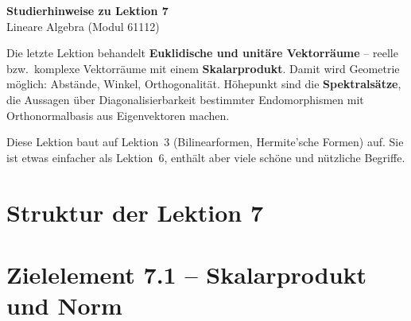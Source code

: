 \documentclass[a4paper,12pt]{article}
\begin{document}
\begin{center}
  {\LARGE\bfseries Studierhinweise zu Lektion 7}\\[0.5em]
  {\large Lineare Algebra (Modul 61112)}
\end{center}

\vspace{0.8em}

Die letzte Lektion behandelt \textbf{Euklidische und unitäre Vektorräume} -- reelle bzw.\ komplexe
Vektorräume mit einem \textbf{Skalarprodukt}. Damit wird Geometrie möglich: Abstände, Winkel,
Orthogonalität. Höhepunkt sind die \textbf{Spektralsätze}, die Aussagen über Diagonalisierbarkeit
bestimmter Endomorphismen mit Orthonormalbasis aus Eigenvektoren machen.

Diese Lektion baut auf Lektion~3 (Bilinearformen, Hermite'sche Formen) auf. Sie ist etwas
einfacher als Lektion~6, enthält aber viele schöne und nützliche Begriffe.

\section*{Struktur der Lektion 7}

\begin{center}
\end{center}

\newpage

\section*{Zielelement 7.1 -- Skalarprodukt und Norm}
\end{document}
